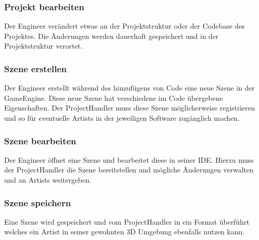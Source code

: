 \documentclass[pagesize, paper=a4, fontsize=12pt, titlepage=true, headings=small, headnosepline, abstractoff, liststotoc, nochapterprefix, plainheadsepline, twoside]{scrreprt}
\begin{document}
\subsubsection{Projekt bearbeiten}
Der Engineer verändert etwas an der Projektstruktur oder der Codebase des Projektes. Die Änderungen werden dauerhaft gespeichert und in der Projektstruktur verortet.

\subsubsection{Szene erstellen}
Der Engineer erstellt während des hinzufügens von Code eine neue Szene in der GameEngine. Diese neue Szene hat verschiedene im Code übergebene Eigenschaften. Der ProjectHandler muss diese Szene möglicherweise registrieren und so für eventuelle Artists in der jeweiligen Software zugänglich machen.

\subsubsection{Szene bearbeiten}
Der Engineer öffnet eine Szene und bearbeitet diese in seiner IDE. Hierzu muss der ProjectHandler die Szene bereitstellen und mögliche Änderungen verwalten und an Artists weitergeben.

\subsubsection{Szene speichern}
Eine Szene wird gespeichert und vom ProjectHandler in ein Format überführt welches ein Artist in seiner gewohnten 3D Umgebung ebenfalls nutzen kann.


\end{document}
